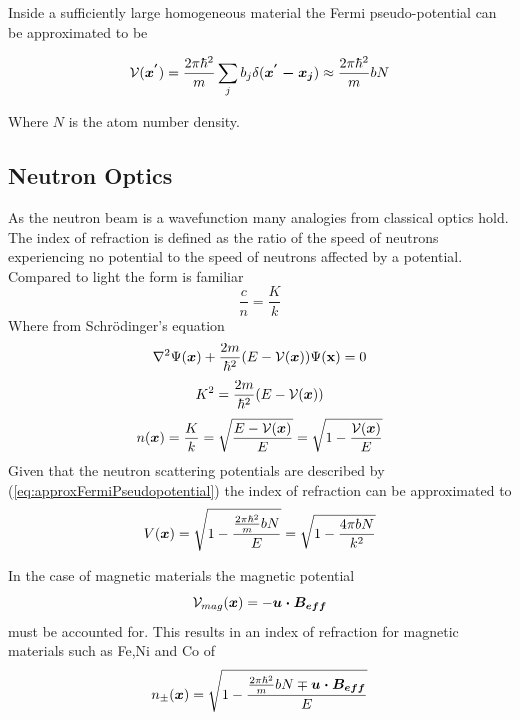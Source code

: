 Inside a sufficiently large homogeneous material the Fermi pseudo-potential can be approximated to be 

\begin{equation}
 \mathcal{V}(\mbox{\boldmath$x^{'}$})  = \frac{2\pi\hbar^2}{m}\sum\limits_{j} b_j \delta(\mbox{\boldmath$x^{'}-x_{j}$}) \approx \frac{2\pi\hbar^2}{m}bN 
\label{eq:approxFermiPseudopotential}
\end{equation}

Where $N$ is the atom number density. 
\subsection{Neutron Optics}
As the neutron beam is a wavefunction many analogies from classical optics hold. The index of refraction is defined as the ratio of the speed of neutrons experiencing no potential to the speed of neutrons affected by a potential. Compared to light the form is familiar 
$$ \frac{c}{n} = \frac{K}{k}$$
Where from Schrödinger's equation
$$\nabla^2\Psi(\mbox{\boldmath$x$}) + \frac{2m}{\hbar^2}(E-\mathcal{V}(\mbox{\boldmath$x$}))\Psi(\mathbf{x}) = 0 $$ 
\begin{equation}
\label{eq:K}
K^2 = \frac{2m}{\hbar^2}(E-\mathcal{V}(\mbox{\boldmath$x$}))
\end{equation}
\begin{equation}
\label{eq:NinPotential}
n(\mbox{\boldmath$x$}) = \frac{K}{k} = \sqrt{\frac{E-\mathcal{V}(\mbox{\boldmath$x$})}{E}}=\sqrt{1-\frac{\mathcal{V}(\mbox{\boldmath$x$})}{E}}
\end{equation}
Given that the neutron scattering potentials are described by (\ref{eq:approxFermiPseudopotential}) the index of refraction can be approximated to \cite{waveguide}
\begin{equation}
V(\mbox{\boldmath$x$}) = \sqrt{1-\frac{\frac{2\pi\hbar^2}{m}bN}{E}}= \sqrt{1 - \frac{4\pi bN}{k^2}}
\label{eq:indexofrefraction}
\end{equation}

In the case of magnetic materials the magnetic potential
\begin{equation*}
\mathcal{V}_{mag}(\mbox{\boldmath$x$})=-\mbox{\boldmath$u \cdot B_{eff}$}
\end{equation*}
 must be accounted for. This results in an index of refraction for magnetic materials such as Fe,Ni and Co of 
\begin{equation}
n_{\pm}(\mbox{\boldmath$x$})= \sqrt{1-\frac{\frac{2\pi\hbar^2}{m}bN \mp \mbox{\boldmath$u \cdot B_{eff}$}}{E}}
\label{eq:nucleurIndexofRefraction}
\end{equation}
